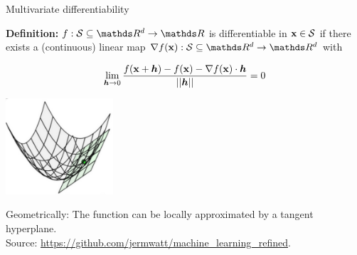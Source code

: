 \documentclass[11pt,compress,t,notes=noshow, xcolor=table]{beamer}
\begin{document}
\begin{vbframe}{Multivariate differentiability}

\textbf{Definition: }$f: \mathcal{S}\subseteq \R^d \to \R$ is differentiable in $\mathbf{x} \in \mathcal{S}$ if there exists a (continuous) linear map $\nabla f(\xv): \mathcal{S}\subseteq \R^d \to \R^d$ with %

$$
\lim_{\bm{h} \to 0} \frac{f(\mathbf{x} + \bm{h}) - f(\mathbf{x}) - \nabla f(\mathbf{x}) \cdot \bm{h}}{||\bm{h}||} = 0
$$

\begin{center}
\includegraphics[width = 0.3\textwidth]{figure_man/differentiability_multivariate.png} \\
\begin{footnotesize}
Geometrically: The function can be locally approximated by a tangent hyperplane. \\
Source: \url{https://github.com/jermwatt/machine_learning_refined}.
\end{footnotesize}
\end{center}

\end{vbframe}
\end{document}
